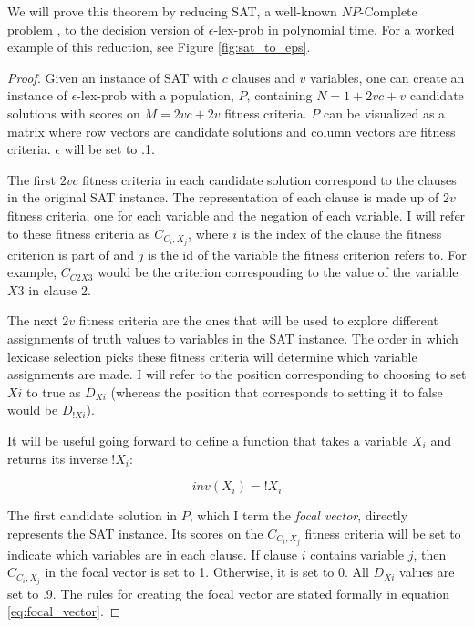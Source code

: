 \documentclass[sigconf]{acmart}
\begin{document}
We will prove this theorem by reducing {\sc SAT}, a well-known $NP$-Complete problem \citep{miller_reducibility_1972}, to the decision version of {\sc $\epsilon$-lex-prob} in polynomial time. For a worked example of this reduction, see Figure \ref{fig:sat_to_eps}.

\begin{proof}
Given an instance of {\sc SAT} with $c$ clauses and $v$ variables, one can create an instance of {\sc $\epsilon$-lex-prob} with a population, $P$, containing $N = 1 + 2vc + v$ candidate solutions with scores on $M = 2vc + 2v$ fitness criteria. $P$ can be visualized as a matrix where row vectors are candidate solutions and column vectors are fitness criteria. $\epsilon$ will be set to .1. 

The first $2vc$ fitness criteria in each candidate solution correspond to the clauses in the original {\sc SAT} instance. The representation of each clause is made up of $2v$ fitness criteria, one for each variable and the negation of each variable. I will refer to these fitness criteria as $C_{C_{i},X_{j}}$, where $i$ is the index of the clause the fitness criterion is part of and $j$ is the id of the variable the fitness criterion refers to. For example, $C_{C2X3}$ would be the criterion corresponding to the value of the variable $X3$ in clause 2.

The next $2v$ fitness criteria are the ones that will be used to explore different assignments of truth values to variables in the {\sc SAT} instance. The order in which lexicase selection picks these fitness criteria will determine which variable assignments are made. I will refer to the position corresponding to choosing to set $Xi$ to true as $D_{Xi}$ (whereas the position that corresponds to setting it to false would be $D_{!Xi}$).

It will be useful going forward to define a function that takes a variable $X_i$ and returns its inverse $!X_i$:

\begin{equation}
    inv(X_i) = !X_i
\end{equation}

The first candidate solution in $P$, which I term the \textit{focal vector}, directly represents the {\sc SAT} instance. Its scores on the $C_{C_{i},X_{j}}$ fitness criteria will be set to indicate which variables are in each clause. If clause $i$ contains variable $j$, then $C_{C_{i},X_{j}}$ in the focal vector is set to 1. Otherwise, it is set to 0. All $D_{Xi}$ values are set to .9. The rules for creating the focal vector are stated formally in equation \ref{eq:focal_vector}.
\vspace{2.5em}


\end{proof}
\end{document}
